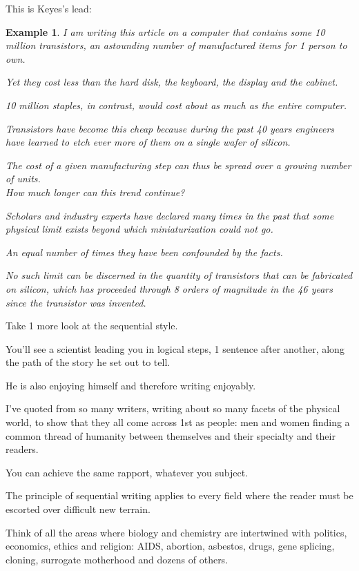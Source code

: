 \documentclass{book}
\numberwithin{equation}{section}
\newtheorem{example}{Example}[chapter]
\begin{document}
This is Keyes's lead:
\begin{example}
    I am writing this article on a computer that contains some 10 million transistors, an astounding number of manufactured items for 1 person to own.
    
    Yet they cost less than the hard disk, the keyboard, the display and the cabinet.
    
    10 million staples, in contrast, would cost about as much as the entire computer.
    
    Transistors have become this cheap because during the past 40 years engineers have learned to etch ever more of them on a single wafer of silicon.
    
    The cost of a given manufacturing step can thus be spread over a growing number of units.\\
    
    How much longer can this trend continue?
    
    Scholars and industry experts have declared many times in the past that some physical limit exists beyond which miniaturization could not go.
    
    An equal number of times they have been confounded by the facts.
    
    No such limit can be discerned in the quantity of transistors that can be fabricated on silicon, which has proceeded through 8 orders of magnitude in the 46 years since the transistor was invented.
\end{example}
Take 1 more look at the sequential style.

You'll see a scientist leading you in logical steps, 1 sentence after another, along the path of the story he set out to tell.

He is also enjoying himself and therefore writing enjoyably.

%
I've quoted from so many writers, writing about so many facets of the physical world, to show that they all come across 1st as people: men and women finding a common thread of humanity between themselves and their specialty and their readers.

You can achieve the same rapport, whatever you subject.

The principle of sequential writing applies to every field where the reader must be escorted over difficult new terrain.

Think of all the areas where biology and chemistry are intertwined with politics, economics, ethics and religion: AIDS, abortion, asbestos, drugs, gene splicing, cloning, surrogate motherhood and dozens of others.
\end{document}
